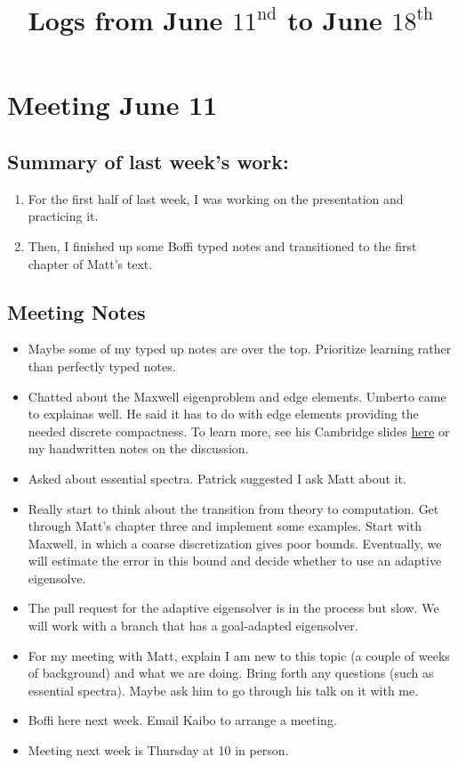 \documentclass[12pt,a4paper]{article}
\title{Logs from June $11^{\text{nd}}$ to June $18^{\text{th}}$}
\author{}
\date{}
\begin{document}
\maketitle

\section{Meeting June 11}

\subsection{Summary of last week's work:}




\begin{enumerate}
    \item For the first half of last week, I was working on the presentation and practicing it.
    \item Then, I finished up some Boffi typed notes and transitioned to the first chapter of Matt's text.
\end{enumerate}



\subsection{Meeting Notes}

\begin{itemize}
   \item Maybe some of my typed up notes are over the top. Prioritize learning rather than perfectly typed notes. 
   \item Chatted about the Maxwell eigenproblem and edge elements. Umberto came to explainas well. He said it has to do with edge elements providing the needed discrete compactness. To learn more, see his Cambridge slides \href{https://www.uzerbinati.eu/assets/slides/cambridge.pdf}{here} or my handwritten notes on the discussion.
   \item Asked about essential spectra. Patrick suggested I ask Matt about it. 
   \item Really start to think about the transition from theory to computation. Get through Matt's chapter three and implement some examples. Start with Maxwell, in which a coarse discretization gives poor bounds. Eventually, we will estimate the error in this bound and decide whether to use an adaptive eigensolve. 
   \item The pull request for the adaptive eigensolver is in the process but slow. We will work with a branch that has a goal-adapted eigensolver. 
   \item For my meeting with Matt, explain I am new to this topic (a couple of weeks of background) and what we are doing. Bring forth any questions (such as essential spectra). Maybe ask him to go through his talk on it with me. 
   \item Boffi here next week. Email Kaibo to arrange a meeting.
   \item Meeting next week is Thursday at 10 in person. 
\end{itemize}
\end{document}
